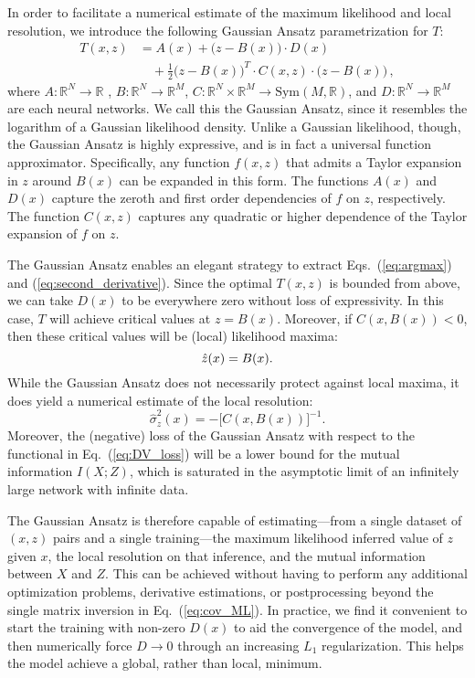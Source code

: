 \documentclass[prl,twocolumn,superscriptaddress,longbibliography,preprintnumbers,floatfix,nofootinbib]{revtex4-1}
\DeclareRobustCommand{\Eq}[1]{Eq.~(\ref{eq:#1})}
\DeclareRobustCommand{\Eqs}[2]{Eqs.~(\ref{eq:#1}) and (\ref{eq:#2})}
\newcommand{\GaussianAnsatz}{{Gaussian Ansatz}\xspace}
\begin{document}
In order to facilitate a numerical estimate of the maximum likelihood and local resolution, we introduce the following \GaussianAnsatz parametrization for $T$:
%
\begin{align}
\label{eq:gaussian_ansatz}
    T(x,z) &= A(x) + \big(z-B(x)\big)\cdot D(x) \nonumber\\&\quad + \frac{1}{2} \big(z-B(x)\big)^T \cdot C(x,z) \cdot \big(z-B(x)\big)\,,
\end{align}
%
where $A:\mathbb{R}^N\xrightarrow{}\mathbb{R}$ , $B:\mathbb{R}^N\xrightarrow{}\mathbb{R}^M$,  $C:\mathbb{R}^N\times\mathbb{R}^M\xrightarrow{}\text{Sym}(M, \mathbb{R})$, and  $D:\mathbb{R}^N\xrightarrow{}\mathbb{R}^M$ are each neural networks.
%
We call this the \GaussianAnsatz, since it resembles the logarithm of a Gaussian likelihood density.
%
Unlike a Gaussian likelihood, though, the \GaussianAnsatz is highly expressive, and is in fact a universal function approximator.
%
Specifically, any function $f(x,z)$ that admits a Taylor expansion in $z$ around $B(x)$ can be expanded in this form.
%
The functions $A(x)$ and $D(x)$ capture the zeroth and first order dependencies of $f$ on $z$, respectively.
%
The function $C(x,z)$ captures any quadratic or higher dependence of the Taylor expansion of $f$ on $z$.


The \GaussianAnsatz enables an elegant strategy to extract \Eqs{argmax}{second_derivative}.
%
Since the optimal $T(x,z)$ is bounded from above, we can take $D(x)$ to be everywhere zero without loss of expressivity.
%
In this case, $T$ will achieve critical values at $z = B(x)$.
%
Moreover, if $C(x, B(x)) < 0$, then these critical values will be (local) likelihood maxima:
%
\begin{equation}
        \hat{z}(x)  = B(x).     \label{eq:y_ML} \\
\end{equation}
%
While the \GaussianAnsatz does not necessarily protect against local maxima, it does yield a numerical estimate of the local resolution:
%
\begin{equation}
    \hat{\sigma}_{z}^2(x)   = - \big[C(x,B(x))\big]^{-1}. \label{eq:cov_ML}
\end{equation}
%
Moreover, the (negative) loss of the \GaussianAnsatz with respect to the functional in \Eq{DV_loss} will be a lower bound for the mutual information $I(X;Z)$, which is saturated in the asymptotic limit of an infinitely large network with infinite data.


The \GaussianAnsatz is therefore capable of estimating---from a single dataset of $(x,z)$ pairs and a single training---the maximum likelihood inferred value of $z$ given $x$, the local resolution on that inference, and the mutual information between $X$ and $Z$.
%
This can be achieved without having to perform any additional optimization problems, derivative estimations, or postprocessing beyond the single matrix inversion in \Eq{cov_ML}.
%
In practice, we find it convenient to start the training with non-zero $D(x)$ to aid the convergence of the model, and then numerically force $D \to 0$ through an increasing $L_1$ regularization.
%
This helps the model achieve a global, rather than local, minimum.
\end{document}
